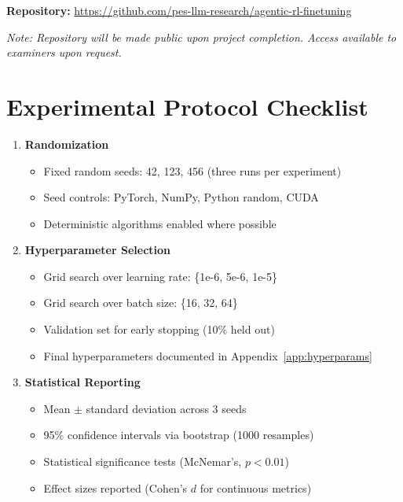 \documentclass[12pt,a4paper]{report}
\theoremstyle{definition}
\begin{document}
\vspace{0.3cm}
\noindent\textbf{Repository:} \url{https://github.com/pes-llm-research/agentic-rl-finetuning}

\noindent\textit{Note: Repository will be made public upon project completion. Access available to examiners upon request.}

\section*{Experimental Protocol Checklist}

\begin{enumerate}[leftmargin=*]
    \item \textbf{Randomization}
    \begin{itemize}[nosep]
        \item[$\square$] Fixed random seeds: 42, 123, 456 (three runs per experiment)
        \item[$\square$] Seed controls: PyTorch, NumPy, Python random, CUDA
        \item[$\square$] Deterministic algorithms enabled where possible
    \end{itemize}

    \item \textbf{Hyperparameter Selection}
    \begin{itemize}[nosep]
        \item[$\square$] Grid search over learning rate: \{1e-6, 5e-6, 1e-5\}
        \item[$\square$] Grid search over batch size: \{16, 32, 64\}
        \item[$\square$] Validation set for early stopping (10\% held out)
        \item[$\square$] Final hyperparameters documented in Appendix~\ref{app:hyperparams}
    \end{itemize}

    \item \textbf{Statistical Reporting}
    \begin{itemize}[nosep]
        \item[$\square$] Mean $\pm$ standard deviation across 3 seeds
        \item[$\square$] 95\% confidence intervals via bootstrap (1000 resamples)
        \item[$\square$] Statistical significance tests (McNemar's, $p < 0.01$)
        \item[$\square$] Effect sizes reported (Cohen's $d$ for continuous metrics)
    \end{itemize}


\end{enumerate}
\end{document}
